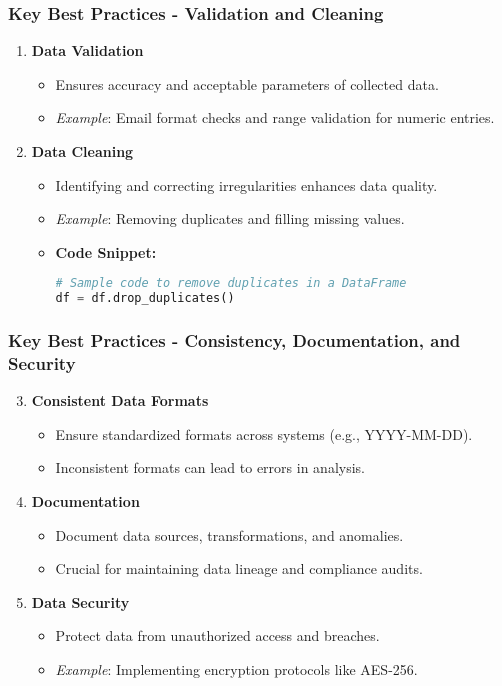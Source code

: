 \documentclass[aspectratio=169]{beamer}
\begin{document}
\begin{frame}
    \frametitle{Key Best Practices - Validation and Cleaning}
    \begin{enumerate}
        \item \textbf{Data Validation}
        \begin{itemize}
            \item Ensures accuracy and acceptable parameters of collected data.
            \item \textit{Example}: Email format checks and range validation for numeric entries.
        \end{itemize}

        \item \textbf{Data Cleaning}
        \begin{itemize}
            \item Identifying and correcting irregularities enhances data quality.
            \item \textit{Example}: Removing duplicates and filling missing values.
            \item \textbf{Code Snippet:}
            \begin{lstlisting}[language=Python]
# Sample code to remove duplicates in a DataFrame
df = df.drop_duplicates()
            \end{lstlisting}
        \end{itemize}
    \end{enumerate}
\end{frame}

\begin{frame}
    \frametitle{Key Best Practices - Consistency, Documentation, and Security}
    \begin{enumerate}
        \setcounter{enumi}{2}
        \item \textbf{Consistent Data Formats}
        \begin{itemize}
            \item Ensure standardized formats across systems (e.g., YYYY-MM-DD).
            \item Inconsistent formats can lead to errors in analysis.
        \end{itemize}

        \item \textbf{Documentation}
        \begin{itemize}
            \item Document data sources, transformations, and anomalies.
            \item Crucial for maintaining data lineage and compliance audits.
        \end{itemize}

        \item \textbf{Data Security}
        \begin{itemize}
            \item Protect data from unauthorized access and breaches.
            \item \textit{Example}: Implementing encryption protocols like AES-256.
        \end{itemize}
    \end{enumerate}
\end{frame}
\end{document}
